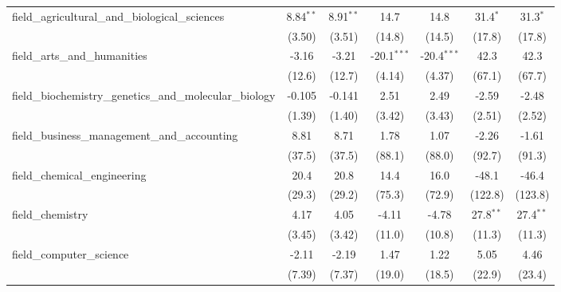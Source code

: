 \begin{tabular}{lcccccc}
   field\_agricultural\_and\_biological\_sciences              & 8.84$^{**}$  & 8.91$^{**}$   & 14.7          & 14.8           & 31.4$^{*}$     & 31.3$^{*}$\\   
                                                               & (3.50)       & (3.51)        & (14.8)        & (14.5)         & (17.8)         & (17.8)\\   
   field\_arts\_and\_humanities                                & -3.16        & -3.21         & -20.1$^{***}$ & -20.4$^{***}$  & 42.3           & 42.3\\   
                                                               & (12.6)       & (12.7)        & (4.14)        & (4.37)         & (67.1)         & (67.7)\\   
   field\_biochemistry\_genetics\_and\_molecular\_biology      & -0.105       & -0.141        & 2.51          & 2.49           & -2.59          & -2.48\\   
                                                               & (1.39)       & (1.40)        & (3.42)        & (3.43)         & (2.51)         & (2.52)\\   
   field\_business\_management\_and\_accounting                & 8.81         & 8.71          & 1.78          & 1.07           & -2.26          & -1.61\\   
                                                               & (37.5)       & (37.5)        & (88.1)        & (88.0)         & (92.7)         & (91.3)\\   
   field\_chemical\_engineering                                & 20.4         & 20.8          & 14.4          & 16.0           & -48.1          & -46.4\\   
                                                               & (29.3)       & (29.2)        & (75.3)        & (72.9)         & (122.8)        & (123.8)\\   
   field\_chemistry                                            & 4.17         & 4.05          & -4.11         & -4.78          & 27.8$^{**}$    & 27.4$^{**}$\\   
                                                               & (3.45)       & (3.42)        & (11.0)        & (10.8)         & (11.3)         & (11.3)\\   
   field\_computer\_science                                    & -2.11        & -2.19         & 1.47          & 1.22           & 5.05           & 4.46\\   
                                                               & (7.39)       & (7.37)        & (19.0)        & (18.5)         & (22.9)         & (23.4)\\   

\end{tabular}
